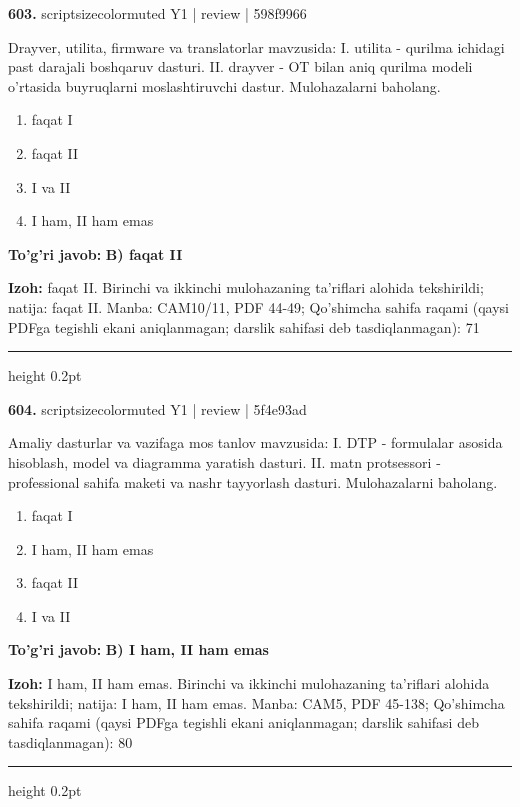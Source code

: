 \documentclass[10pt,a4paper]{article}
\begin{document}
{\bfseries\sffamily\color{ink} 603.} {scriptsizecolor{muted} Y1 | review | 598f9966}
\par
Drayver, utilita, firmware va translatorlar mavzusida: I. utilita - qurilma ichidagi past darajali boshqaruv dasturi. II. drayver - OT bilan aniq qurilma modeli o'rtasida buyruqlarni moslashtiruvchi dastur. Mulohazalarni baholang.
\begin{enumerate}[label=\Alph*),leftmargin=9mm]
\item faqat I
\item faqat II
\item I va II
\item I ham, II ham emas
\end{enumerate}
\begin{tcolorbox}[enhanced,breakable,colback=teal!4,colframe=teal!60!black,boxrule=0.45pt,arc=1.2mm,left=2.7mm,right=2.7mm,top=1.8mm,bottom=1.8mm,before skip=2mm,after skip=2mm]
{\bfseries\sffamily\color{teal}To'g'ri javob:} \textbf{B) faqat II}
\par\smallskip
{\bfseries Izoh:} faqat II. Birinchi va ikkinchi mulohazaning ta'riflari alohida tekshirildi; natija: faqat II. Manba: CAM10/11, PDF 44-49; Qo'shimcha sahifa raqami (qaysi PDFga tegishli ekani aniqlanmagan; darslik sahifasi deb tasdiqlanmagan): 71
\end{tcolorbox}
\vspace{2mm}\hrule height 0.2pt\vspace{3mm}

{\bfseries\sffamily\color{ink} 604.} {scriptsizecolor{muted} Y1 | review | 5f4e93ad}
\par
Amaliy dasturlar va vazifaga mos tanlov mavzusida: I. DTP - formulalar asosida hisoblash, model va diagramma yaratish dasturi. II. matn protsessori - professional sahifa maketi va nashr tayyorlash dasturi. Mulohazalarni baholang.
\begin{enumerate}[label=\Alph*),leftmargin=9mm]
\item faqat I
\item I ham, II ham emas
\item faqat II
\item I va II
\end{enumerate}
\begin{tcolorbox}[enhanced,breakable,colback=teal!4,colframe=teal!60!black,boxrule=0.45pt,arc=1.2mm,left=2.7mm,right=2.7mm,top=1.8mm,bottom=1.8mm,before skip=2mm,after skip=2mm]
{\bfseries\sffamily\color{teal}To'g'ri javob:} \textbf{B) I ham, II ham emas}
\par\smallskip
{\bfseries Izoh:} I ham, II ham emas. Birinchi va ikkinchi mulohazaning ta'riflari alohida tekshirildi; natija: I ham, II ham emas. Manba: CAM5, PDF 45-138; Qo'shimcha sahifa raqami (qaysi PDFga tegishli ekani aniqlanmagan; darslik sahifasi deb tasdiqlanmagan): 80
\end{tcolorbox}
\vspace{2mm}\hrule height 0.2pt\vspace{3mm}
\end{document}
